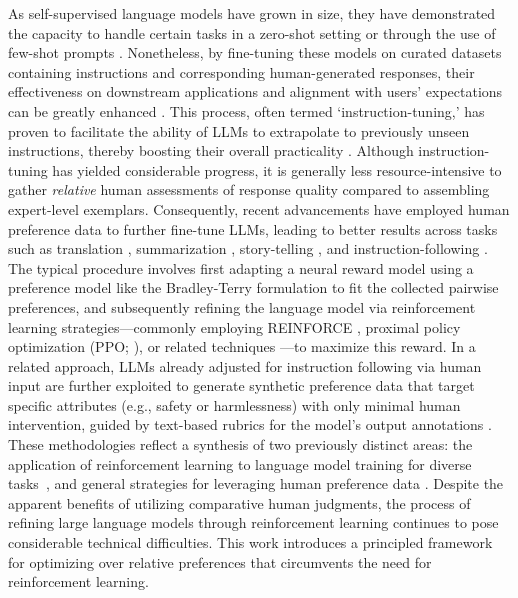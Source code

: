 As self-supervised language models have grown in size, they have demonstrated the capacity to handle certain tasks in a zero-shot setting \citep{radford2019language} or through the use of few-shot prompts \citep{gpt3,megatron,chowdhery2022palm}. Nonetheless, by fine-tuning these models on curated datasets containing instructions and corresponding human-generated responses, their effectiveness on downstream applications and alignment with users’ expectations can be greatly enhanced \citep{mishra-etal-2022-cross,sanh2022multitask,chung2022scaling,thoppilan2022lamda}. This process, often termed ‘instruction-tuning,’ has proven to facilitate the ability of LLMs to extrapolate to previously unseen instructions, thereby boosting their overall practicality \citep{chung2022scaling}. Although instruction-tuning has yielded considerable progress, it is generally less resource-intensive to gather \textit{relative} human assessments of response quality compared to assembling expert-level exemplars. Consequently, recent advancements have employed human preference data to further fine-tune LLMs, leading to better results across tasks such as translation \citep{kreutzer-etal-2018-reliability}, summarization \citep{stiennon2022learning,ziegler2020finetuning}, story-telling \citep{ziegler2020finetuning}, and instruction-following \citep{ouyang2022training,ramamurthy2023is}. The typical procedure involves first adapting a neural reward model using a preference model like the Bradley-Terry formulation \citep{bradley1952rankanalysis} to fit the collected pairwise preferences, and subsequently refining the language model via reinforcement learning strategies—commonly employing REINFORCE \citep{williams1992reinforce}, proximal policy optimization (PPO; \cite{schulman2017proximal}), or related techniques \citep{ramamurthy2023is}—to maximize this reward. In a related approach, LLMs already adjusted for instruction following via human input are further exploited to generate synthetic preference data that target specific attributes (e.g., safety or harmlessness) with only minimal human intervention, guided by text-based rubrics for the model’s output annotations \citep{bai2022constitutional}. These methodologies reflect a synthesis of two previously distinct areas: the application of reinforcement learning to language model training for diverse tasks~\citep{Ranzato2015SequenceLT,paulus2018a,wu2018learning}, and general strategies for leveraging human preference data \citep{christiano2017deep,kupcsik2018learning}. Despite the apparent benefits of utilizing comparative human judgments, the process of refining large language models through reinforcement learning continues to pose considerable technical difficulties. This work introduces a principled framework for optimizing over relative preferences that circumvents the need for reinforcement learning.

